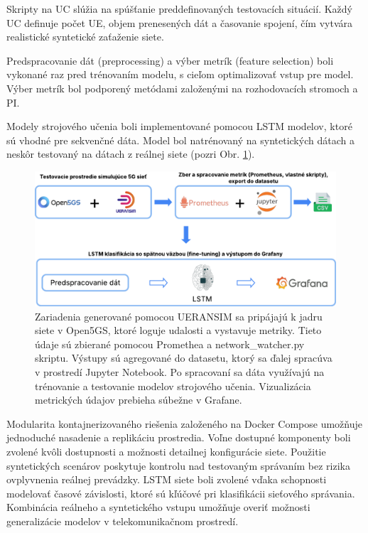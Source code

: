 Skripty na UC slúžia na spúšťanie preddefinovaných testovacích situácií. Každý UC definuje počet UE, objem prenesených dát a časovanie spojení, čím vytvára realistické syntetické zaťaženie siete.

Predspracovanie dát (preprocessing) a výber metrík (feature selection) boli vykonané raz pred trénovaním modelu, s cieľom optimalizovať vstup pre model. Výber metrík bol podporený metódami založenými na rozhodovacích stromoch a PI.

Modely strojového učenia boli implementované pomocou LSTM modelov, ktoré sú vhodné pre sekvenčné dáta. Model bol natrénovaný na syntetických dátach a neskôr testovaný na dátach z reálnej siete (pozri Obr. \ref{fig:arch}).

\begin{figure}[H]
    \centering
    \includegraphics[width=0.95\linewidth]{assets//images/arch2.png}
    \caption[Architektúra systému: simulácia 5G siete, zber metrických dát a real-time klasifikácia s výstupom do Grafany.]{Zariadenia generované pomocou UERANSIM sa pripájajú k jadru siete v Open5GS, ktoré loguje udalosti a vystavuje metriky. Tieto údaje sú zbierané pomocou Promethea a network\_watcher.py skriptu. Výstupy sú agregované do datasetu, ktorý sa ďalej spracúva v prostredí Jupyter Notebook. Po spracovaní sa dáta využívajú na trénovanie a testovanie modelov strojového učenia. Vizualizácia metrických údajov prebieha súbežne v Grafane.}
    \label{fig:arch}
\end{figure}

Modularita kontajnerizovaného riešenia založeného na Docker Compose umožňuje jednoduché nasadenie a replikáciu prostredia. Voľne dostupné komponenty boli zvolené kvôli dostupnosti a možnosti detailnej konfigurácie siete. Použitie syntetických scenárov poskytuje kontrolu nad testovaným správaním bez rizika ovplyvnenia reálnej prevádzky. LSTM siete boli zvolené vďaka schopnosti modelovať časové závislosti, ktoré sú kľúčové pri klasifikácii sieťového správania. Kombinácia reálneho a syntetického vstupu umožňuje overiť možnosti generalizácie modelov v telekomunikačnom prostredí.